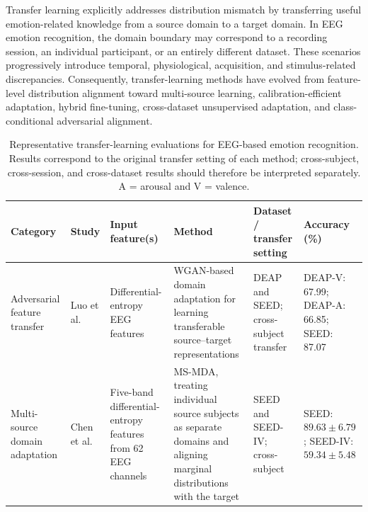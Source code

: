 \documentclass{WileyMSP-template}
\begin{document}
Transfer learning explicitly addresses distribution mismatch by transferring useful emotion-related knowledge from a source domain to a target domain. In EEG emotion recognition, the domain boundary may correspond to a recording session, an individual participant, or an entirely different dataset. These scenarios progressively introduce temporal, physiological, acquisition, and stimulus-related discrepancies. Consequently, transfer-learning methods have evolved from feature-level distribution alignment toward multi-source learning, calibration-efficient adaptation, hybrid fine-tuning, cross-dataset unsupervised adaptation, and class-conditional adversarial alignment.

\begin{table}
\centering

\caption{Representative transfer-learning evaluations for EEG-based emotion recognition.
Results correspond to the original transfer setting of each method; cross-subject,
cross-session, and cross-dataset results should therefore be interpreted separately.
A = arousal and V = valence.}

\label{tab:transfer_learning_results}

\scriptsize
\setlength{\tabcolsep}{3.0pt}
\renewcommand{\arraystretch}{1.18}

\begin{tabularx}{\textheight}{
>{\raggedright\arraybackslash}p{2.65cm}
>{\raggedright\arraybackslash}p{3.15cm}
>{\raggedright\arraybackslash}X
>{\raggedright\arraybackslash}X
>{\raggedright\arraybackslash}p{3.8cm}
>{\raggedright\arraybackslash}p{5.25cm}}

\toprule

\textbf{Category} &
\textbf{Study} &
\textbf{Input feature(s)} &
\textbf{Method} &
\textbf{Dataset / transfer setting} &
\textbf{Accuracy (\%)} \\

\midrule

Adversarial feature transfer &
Luo et al. \cite{luo2018iconip_wganda} &
Differential-entropy EEG features &
WGAN-based domain adaptation for learning transferable source--target representations &
DEAP and SEED; cross-subject transfer &
DEAP-V: 67.99; DEAP-A: 66.85; SEED: 87.07 \\

Multi-source domain adaptation &
Chen et al. \cite{chen2021frontiers_msmda} &
Five-band differential-entropy features from 62 EEG channels &
MS-MDA, treating individual source subjects as separate domains and aligning marginal distributions with the target &
SEED and SEED-IV; cross-subject &
SEED: $89.63 \pm 6.79$; SEED-IV: $59.34 \pm 5.48$ \\


\end{tabularx}
\end{table}
\end{document}
